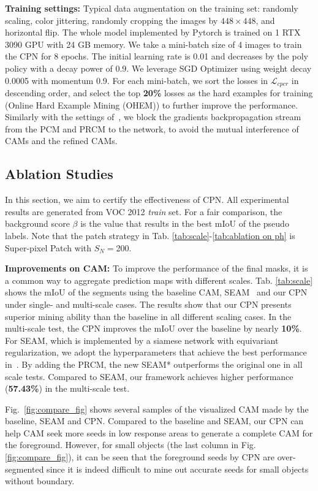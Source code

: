\documentclass[10pt,twocolumn,letterpaper]{article}
\begin{document}
\noindent\textbf{Training settings:}\; Typical data augmentation on the training set: randomly scaling, color jittering, randomly cropping the images by $448 \times 448$, and horizontal flip. The whole model implemented by Pytorch is trained on 1 RTX 3090 GPU with 24 GB memory. We take a mini-batch size of 4 images to train the CPN for 8 epochs. The initial learning rate is 0.01 and decreases by the poly policy with a decay power of  0.9. We leverage SGD Optimizer using weight decay 0.0005 with momentum 0.9. For each mini-batch, we sort the losses in $\mathcal {L}_{cpcr}$ in descending order, and select the top {\textbf{20\%}} losses as the hard examples for training (Online Hard Example Mining (OHEM)) to further improve the performance. Similarly with the settings of~\cite{seam}, we block the gradients backpropagation stream from the PCM and PRCM to the network, to avoid the mutual interference of CAMs and the refined CAMs.
\subsection{Ablation Studies}
In this section, we aim to certify the effectiveness of CPN. All experimental results are generated from VOC 2012 \textit{train} set. For a fair comparison, the background score $\beta$ is the value that results in the best mIoU of the pseudo labels. Note that the patch strategy in Tab. \ref{tab:scale}-\ref{tab:ablation on ph} is Super-pixel Patch with $S_N = $200.


\noindent\textbf{Improvements on CAM:}\; To improve the performance of the final masks, it is a common way to aggregate prediction maps with different scales. Tab. \ref{tab:scale} shows the mIoU of the segments using the baseline CAM, SEAM~\cite{seam} and our CPN under single- and multi-scale cases. The results show that our CPN presents superior mining ability than the baseline in all different scaling cases. In the multi-scale test, the CPN improves the mIoU over the baseline by nearly \textbf{10\%}. For SEAM, which is implemented by a siamese network with equivariant regularization, we adopt the hyperparameters that achieve the best performance in~\cite{seam}. By adding the PRCM, the new SEAM* outperforms the original one in all scale tests. Compared to SEAM, our framework achieves higher performance (\textbf{57.43\%}) in the multi-scale test.

Fig.~\ref{fig:compare_fig} shows several samples of the visualized CAM made by the baseline, SEAM and CPN. Compared to the baseline and SEAM, our CPN can help CAM seek more seeds in low response areas to generate a complete CAM for the foreground.  However, for small objects (the last column in Fig. \ref{fig:compare_fig}), it can be seen that the foreground seeds by CPN are over-segmented since it is indeed difficult to mine out accurate seeds for small objects without boundary.
\end{document}

